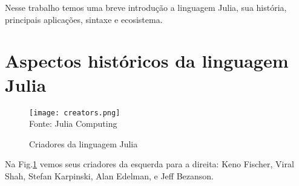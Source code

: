  Nesse trabalho temos uma breve introdução a linguagem Julia, sua história, principais aplicações, sintaxe e ecosistema. 





\newpage
\section{Aspectos históricos da linguagem Julia}

\begin{figure}[H]
   \begin{center}
       \caption{Criadores da linguagem Julia} \label{criadores}
       \texttt{[image: creators.png]} \\
       {\tiny \sf Fonte: Julia Computing}
   \end{center}
  \end{figure}

Na Fig.\ref{criadores} vemos seus criadores da esquerda para a direita: Keno Fischer, Viral Shah, Stefan Karpinski, Alan Edelman, e Jeff Bezanson.
\newline

